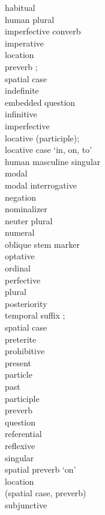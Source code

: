 \begin{multicols}{2}
\begin{tabbing}
				\>	habitual\\
				\>	human plural\\
				\>	imperfective converb\\
				\>	imperative\\
				\>	location \\
			{}		\>	    preverb ;\\
			{}		\>	    spatial case  \\
				\>	indefinite\\
				\>	embedded question\\
				\>	infinitive\\
				\>	imperfective\\
				\>	locative (participle);\\
			{}		\>	locative case `in, on, to'\\
					\>	human masculine singular\\
				\>	modal\\
				\>	modal interrogative\\
				\>	negation\\
				\>	nominalizer\\
				\>	neuter plural\\
				\>	numeral\\
				\>	oblique stem marker\\
				\>	optative\\
				\>	ordinal\\
				\>	perfective\\
				\>	plural\\
				\>	posteriority \\
			{}		\>	    temporal suffix ;\\
			{}		\>	    spatial case  \\
				\>	preterite\\
				\>	prohibitive\\
				\>	present\\
				\>	particle\\
				\>	past\\
				\>	participle\\
				\>	preverb\\
					\>	question\\
				\>	referential\\
				\>	reflexive\\
				\>	singular\\
				\>	spatial preverb `on'\\
				\>	location \\
			{}		\>	(spatial case, preverb)\\
				\>	subjunctive
		\end{tabbing}
	\end{multicols}


